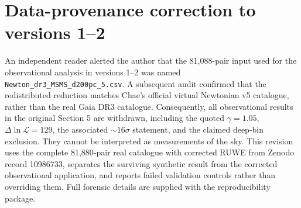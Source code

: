\maketitle

\section*{Data-provenance correction to versions 1--2}
An independent reader alerted the author that the 81,088-pair input used for
the observational analysis in versions 1--2 was named
\texttt{Newton\_dr3\_MSMS\_d200pc\_5.csv}.  A subsequent audit confirmed that
the redistributed reduction matches Chae's official virtual Newtonian v5
catalogue, rather than the real Gaia DR3 catalogue.  Consequently, all
observational results in the original Section 5 are withdrawn, including the
quoted $\gamma=1.05$, $\Delta\ln\mathcal L=129$, the associated
$\sim16\sigma$ statement, and the claimed deep-bin exclusion.  They cannot be
interpreted as measurements of the sky.  This revision uses the complete
81,880-pair real catalogue with corrected RUWE from Zenodo record 10986733,
separates the surviving synthetic result from the corrected observational
application, and reports failed validation controls rather than overriding
them.  Full forensic details are supplied with the reproducibility package.

\begin{abstract}
We study the sensitivity of wide-binary gravity estimators to residual
hierarchical triples and eccentricity modelling.  Known-truth catalogues are
constructed from Keplerian binaries and hierarchical triples, with Gaia-like
noise and the upstream velocity selection.  On Newtonian truth with a residual
triple fraction of 0.2--0.3, a full-median estimator recovers
$\gamma=G_{\rm eff}/G_{\rm N}=1.062$--$1.128$, whereas a tail-truncated
estimator gives 1.002--1.044 and a binary--triple mixture likelihood gives
0.98--1.00.  When $\gamma=1.4$ is injected above 2 kau, the latter two
estimators give 1.306--1.346 and 1.36--1.40.  This supports a methodological
claim: residual triple tails can create a positive bias in a full-median
estimator, while matched truncation or explicit mixture modelling reduces it.
The corrected real-data application uses Chae's 81,880-pair Gaia catalogue with
corrected RUWE.  In the 2--30 kau zone, the truncated estimator gives
$1.084\,[1.063,1.105]$ for empirical per-zone eccentricities but
$1.007\,[0.987,1.023]$ for a thermal distribution; the corresponding mixture
fits give 1.13 and 1.01.  Crucially, the empirical and superthermal branches
fail the pre-specified 2 per cent validation-zone control, while the thermal
branch passes.  Deep-bin estimates span 1.22--1.31 with broad 68 per cent
intervals.  The corrected Gaia DR3 outcome is therefore model-dependent and
non-conclusive under the pre-registered decision logic.  No high-significance
observational gravity verdict is claimed.
\end{abstract}

